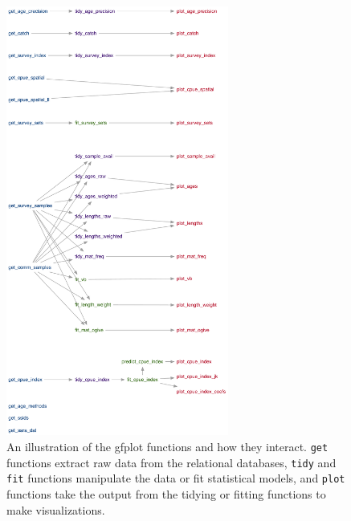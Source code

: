 \documentclass[11pt]{book}\usepackage[]{graphicx}\usepackage[]{color}
\begin{document}
\begin{figure}[htbp]
  \centering
    \includegraphics[width=0.65\textwidth]{doc/function-web.pdf}
    \caption{An illustration of the gfplot functions and how they interact.
    \texttt{get} functions extract raw data from the relational databases, \texttt{tidy}
  and \texttt{fit} functions manipulate the data or fit statistical models, and
  \texttt{plot} functions take the output from the tidying or fitting functions to
  make visualizations.}
  \label{fig:gfplot-web}
\end{figure}


\clearpage


\end{document}
